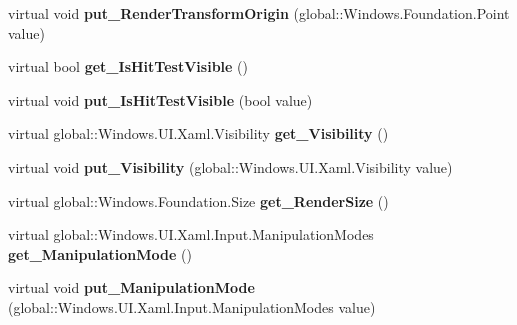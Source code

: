 \begin{DoxyCompactItemize}
\mbox{\label{class_windows_1_1_u_i_1_1_xaml_1_1_u_i_element_a3384cc317262d95a77573d76f771778d}} 
virtual void {\bfseries put\+\_\+\+Render\+Transform\+Origin} (global\+::\+Windows.\+Foundation.\+Point value)
\item 
\mbox{\label{class_windows_1_1_u_i_1_1_xaml_1_1_u_i_element_acafd318a1c0b56bfb701aec3a210bec1}} 
virtual bool {\bfseries get\+\_\+\+Is\+Hit\+Test\+Visible} ()
\item 
\mbox{\label{class_windows_1_1_u_i_1_1_xaml_1_1_u_i_element_a91c0826f6d39080d6e6c6bca0144cdb1}} 
virtual void {\bfseries put\+\_\+\+Is\+Hit\+Test\+Visible} (bool value)
\item 
\mbox{\label{class_windows_1_1_u_i_1_1_xaml_1_1_u_i_element_a28fb7dc5ba5e68bbf934a134e97777f2}} 
virtual global\+::\+Windows.\+U\+I.\+Xaml.\+Visibility {\bfseries get\+\_\+\+Visibility} ()
\item 
\mbox{\label{class_windows_1_1_u_i_1_1_xaml_1_1_u_i_element_aa21b9a45ef782cd5fe687bf2ad1b542a}} 
virtual void {\bfseries put\+\_\+\+Visibility} (global\+::\+Windows.\+U\+I.\+Xaml.\+Visibility value)
\item 
\mbox{\label{class_windows_1_1_u_i_1_1_xaml_1_1_u_i_element_ae8754f086fb49dc408bd75c4277a1aaa}} 
virtual global\+::\+Windows.\+Foundation.\+Size {\bfseries get\+\_\+\+Render\+Size} ()
\item 
\mbox{\label{class_windows_1_1_u_i_1_1_xaml_1_1_u_i_element_a144176607f6318a776be9a5bd0836be5}} 
virtual global\+::\+Windows.\+U\+I.\+Xaml.\+Input.\+Manipulation\+Modes {\bfseries get\+\_\+\+Manipulation\+Mode} ()
\item 
\mbox{\label{class_windows_1_1_u_i_1_1_xaml_1_1_u_i_element_a2d57a47a49d348fcb616d78e70fbb023}} 
virtual void {\bfseries put\+\_\+\+Manipulation\+Mode} (global\+::\+Windows.\+U\+I.\+Xaml.\+Input.\+Manipulation\+Modes value)

\end{DoxyCompactItemize}
